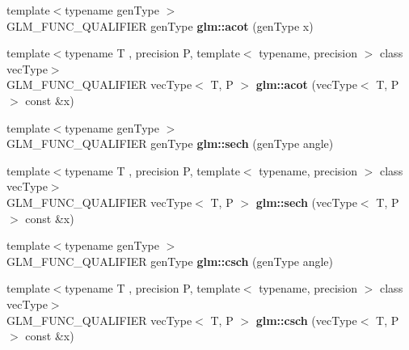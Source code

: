 \begin{DoxyCompactItemize}
\item 
\hypertarget{namespaceglm_add36fe1afa6b5889b971ebc569f1579d}{{\footnotesize template$<$typename gen\-Type $>$ }\\G\-L\-M\-\_\-\-F\-U\-N\-C\-\_\-\-Q\-U\-A\-L\-I\-F\-I\-E\-R gen\-Type {\bfseries glm\-::acot} (gen\-Type x)}\label{namespaceglm_add36fe1afa6b5889b971ebc569f1579d}

\item 
\hypertarget{namespaceglm_a83b17146fd12b7822b1a6ef98790a8da}{{\footnotesize template$<$typename T , precision P, template$<$ typename, precision $>$ class vec\-Type$>$ }\\G\-L\-M\-\_\-\-F\-U\-N\-C\-\_\-\-Q\-U\-A\-L\-I\-F\-I\-E\-R vec\-Type$<$ T, P $>$ {\bfseries glm\-::acot} (vec\-Type$<$ T, P $>$ const \&x)}\label{namespaceglm_a83b17146fd12b7822b1a6ef98790a8da}

\item 
\hypertarget{namespaceglm_a624f38daef5fc0ac5dd3b0ebf3d5d0df}{{\footnotesize template$<$typename gen\-Type $>$ }\\G\-L\-M\-\_\-\-F\-U\-N\-C\-\_\-\-Q\-U\-A\-L\-I\-F\-I\-E\-R gen\-Type {\bfseries glm\-::sech} (gen\-Type angle)}\label{namespaceglm_a624f38daef5fc0ac5dd3b0ebf3d5d0df}

\item 
\hypertarget{namespaceglm_ad9b404c885d4fb0f7d227186b2444a10}{{\footnotesize template$<$typename T , precision P, template$<$ typename, precision $>$ class vec\-Type$>$ }\\G\-L\-M\-\_\-\-F\-U\-N\-C\-\_\-\-Q\-U\-A\-L\-I\-F\-I\-E\-R vec\-Type$<$ T, P $>$ {\bfseries glm\-::sech} (vec\-Type$<$ T, P $>$ const \&x)}\label{namespaceglm_ad9b404c885d4fb0f7d227186b2444a10}

\item 
\hypertarget{namespaceglm_abf6760fd12e46b2805237ff556d80d60}{{\footnotesize template$<$typename gen\-Type $>$ }\\G\-L\-M\-\_\-\-F\-U\-N\-C\-\_\-\-Q\-U\-A\-L\-I\-F\-I\-E\-R gen\-Type {\bfseries glm\-::csch} (gen\-Type angle)}\label{namespaceglm_abf6760fd12e46b2805237ff556d80d60}

\item 
\hypertarget{namespaceglm_aefec80643f2f2bde7247fa8d54ccd351}{{\footnotesize template$<$typename T , precision P, template$<$ typename, precision $>$ class vec\-Type$>$ }\\G\-L\-M\-\_\-\-F\-U\-N\-C\-\_\-\-Q\-U\-A\-L\-I\-F\-I\-E\-R vec\-Type$<$ T, P $>$ {\bfseries glm\-::csch} (vec\-Type$<$ T, P $>$ const \&x)}\label{namespaceglm_aefec80643f2f2bde7247fa8d54ccd351}


\end{DoxyCompactItemize}
